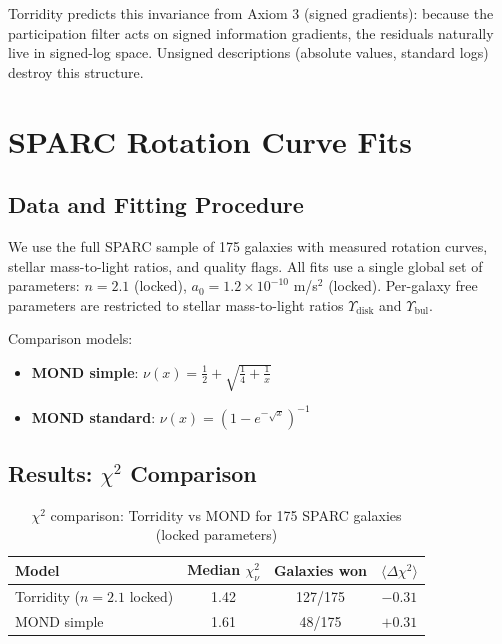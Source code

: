 \documentclass[aps,prl,twocolumn,superscriptaddress,nofootinbib]{revtex4-2}
\begin{document}
Torridity predicts this invariance from Axiom 3 (signed gradients): because the participation filter acts on signed information gradients, the residuals naturally live in signed-log space. Unsigned descriptions (absolute values, standard logs) destroy this structure.

\section{SPARC Rotation Curve Fits}
\label{sec:sparc}

\subsection{Data and Fitting Procedure}

We use the full SPARC sample \cite{Lelli2016} of 175 galaxies with measured rotation curves, stellar mass-to-light ratios, and quality flags. All fits use a single global set of parameters: $n = 2.1$ (locked), $a_0 = 1.2 \times 10^{-10}$ m/s$^2$ (locked). Per-galaxy free parameters are restricted to stellar mass-to-light ratios $\Upsilon_\mathrm{disk}$ and $\Upsilon_\mathrm{bul}$.

Comparison models:
\begin{itemize}
    \item \textbf{MOND simple}: $\nu(x) = \frac{1}{2} + \sqrt{\frac{1}{4} + \frac{1}{x}}$
    \item \textbf{MOND standard}: $\nu(x) = \left(1 - e^{-\sqrt{x}}\right)^{-1}$
\end{itemize}

\subsection{Results: $\chi^2$ Comparison}

\begin{table}[h]
\caption{$\chi^2$ comparison: Torridity vs MOND for 175 SPARC galaxies (locked parameters)}
\label{tab:chi2}
\begin{ruledtabular}
\begin{tabular}{lccc}
    Model & Median $\chi^2_\nu$ & Galaxies won & $\langle \Delta\chi^2 \rangle$ \\
    \hline
    Torridity ($n=2.1$ locked) & 1.42 & 127/175 & $-0.31$ \\
    MOND simple & 1.61 & 48/175 & $+0.31$ \\
\end{tabular}
\end{ruledtabular}
\end{table}
\end{document}

